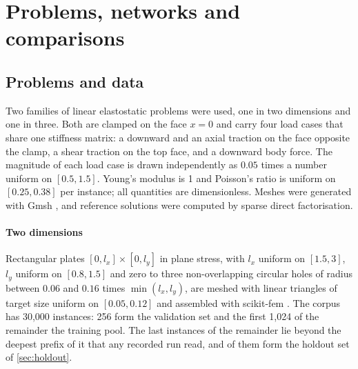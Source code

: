 \section{Problems, networks and comparisons}\label{sec:methods}

\subsection{Problems and data}\label{sec:methods:data}

Two families of linear elastostatic problems were used, one in two dimensions and one in
three. Both are clamped on the face $x=0$ and carry four load cases that share one stiffness
matrix: a downward and an axial traction on the face opposite the clamp, a shear traction on
the top face, and a downward body force. The magnitude of each load case is drawn
independently as $0.05$ times a number uniform on $[0.5,1.5]$. Young's modulus is 1 and
Poisson's ratio is uniform on $[0.25,0.38]$ per instance; all quantities are dimensionless.
Meshes were generated with Gmsh \cite{Geuzaine2009}, and reference solutions were computed
by sparse direct factorisation.

\paragraph{Two dimensions}
Rectangular plates $[0,l_x]\times[0,l_y]$ in plane stress, with $l_x$ uniform on $[1.5,3]$,
$l_y$ uniform on $[0.8,1.5]$ and zero to three non-overlapping circular holes of radius
between $0.06$ and $0.16$ times $\min(l_x,l_y)$, are meshed with linear triangles of target
size uniform on $[0.05,0.12]$ and assembled with scikit-fem \cite{Gustafsson2020}. The
corpus has 30,000 instances: 256 form the validation set and the first 1,024 of the
remainder the training pool. The last \numHoldTwoTail{} instances of the remainder lie
beyond the deepest prefix of it that any recorded run read, and \numHoldTwoN{} of them form
the holdout set of \cref{sec:holdout}.

